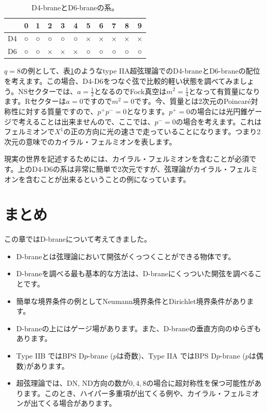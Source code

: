 \documentclass[report,paper=a4, fontsize=12pt, line_length=16cm, number_of_lines=34,dvipdfmx]{jlreq}
\numberwithin{equation}{chapter}
\numberwithin{equation}{section}
\begin{document}
\begin{table}
  \centering
  \begin{tabular}{|c||c|c|c|c|c|c|c|c|c|c|}\hline
    &0 &1 &2 &3 &4 &5 &6 &7 &8 &9 \\ \hline\hline
  D4&○&○&○&○&○&×&×&×&×&×\\ \hline    
  D6&○&○&×&×&×&○&○&○&○&○\\ \hline    
  \end{tabular}
  \caption{D4-braneとD6-braneの系。}
  \label{tab:D4D6}
\end{table}
$q=8$の例として、表\ref{tab:D4D6}のようなtype IIA超弦理論でのD4-braneとD6-braneの配位を考えます。この場合、D4-D6をつなぐ弦で比較的軽い状態を調べてみましょう。NSセクターでは、$a=\frac12$となるのでFock真空は$m^2=\frac14$となって有質量になります。Rセクターは$a=0$ですので$m^2=0$です。今、質量とは2次元のPoincar\'e対称性に対する質量ですので、$p^{+}p^{-}=0$となります。$p^{+}=0$の場合には光円錐ゲージで考えることは出来ませんので、ここでは、$p^{-}=0$の場合を考えます。これはフェルミオンで$X^{1}$の正の方向に光の速さで走っていることになります。つまり2次元の意味でのカイラル・フェルミオンを表します。

現実の世界を記述するためには、カイラル・フェルミオンを含むことが必須です。上のD4-D6の系は非常に簡単で2次元ですが、弦理論がカイラル・フェルミオンを含むことが出来るということの例になっています。

\section{まとめ}
この章ではD-braneについて考えてきました。
\begin{itemize}
  \item D-braneとは弦理論において開弦がくっつくことができる物体です。
  \item D-braneを調べる最も基本的な方法は、D-braneにくっついた開弦を調べることです。
  \item 簡単な境界条件の例としてNeumann境界条件とDirichlet境界条件があります。
  \item D-braneの上にはゲージ場があります。また、D-braneの垂直方向のゆらぎもあります。
  \item Type IIB ではBPS D$p$-brane ($p$は奇数)、Type IIA ではBPS D$p$-brane ($p$は偶数)があります。
  \item 超弦理論では、DN, ND方向の数が$0,4,8$の場合に超対称性を保つ可能性があります。このとき、ハイパー多重項が出てくる例や、カイラル・フェルミオンが出てくる場合があります。
\end{itemize}
\end{document}
